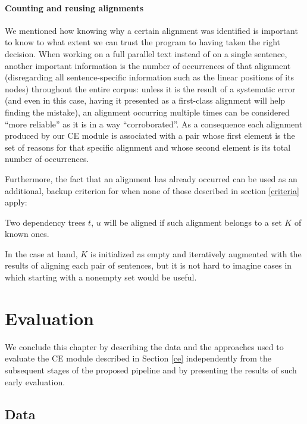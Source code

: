 \paragraph{Counting and reusing alignments}
We mentioned how knowing why a certain alignment was identified is important to know to what extent we can trust the program to having taken the right decision. When working on a full parallel text instead of on a single sentence, another important information is the number of occurrences of that alignment (disregarding all sentence-specific information such as the linear positions of its nodes) throughout the entire corpus: unless it is the result of a systematic error (and even in this case, having it presented as a first-class alignment will help finding the mistake), an alignment occurring multiple times can be considered ``more reliable'' as it is in a way ``corroborated''. As a consequence each alignment produced by our CE module is associated with a pair whose first element is the set of reasons for that specific alignment and whose second element is its total number of occurrences. \smallskip

Furthermore, the fact that an alignment has already occurred can be used as an additional, backup criterion for when none of those described in section \ref{criteria} apply: \smallskip

\begin{criterion} \label{known}
 Two dependency trees $t$, $u$ will be aligned if such alignment belongs to a set $K$ of known ones.
\end{criterion} \smallskip

In the case at hand, $K$ is initialized as empty and iteratively augmented with the results of aligning each pair of sentences, but it is not hard to imagine cases in which starting with a nonempty set would be useful.

\section{Evaluation} \label{eval2}
We conclude this chapter by describing the data and the approaches used to evaluate the CE module described in Section \ref{ce} independently from the subsequent stages of the proposed pipeline and by presenting the results of such early evaluation.

\subsection{Data} \label{pud}

